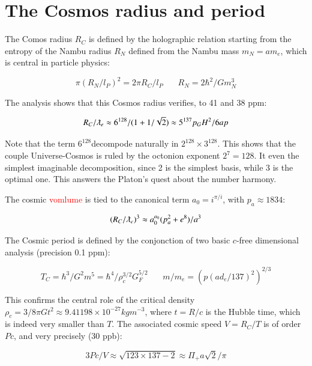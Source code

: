 \documentclass[a4paper,9pt]{article}
\begin{document}
\section{The Cosmos radius and period}

The Comos radius $R_C$ is defined by the holographic relation starting from the entropy of the Nambu radius $R_N$ defined from the Nambu mass $m_N = am_e$, which is central in particle physics:

\begin{equation}
\pi (R_N/l_P)^2 = 2\pi R_C/l_P ~~~~~~~~   R_N = 2\hbar^2/ Gm_N^3
\end{equation}

The analysis shows that this Cosmos radius verifies, to 41 and 38 ppm:

\begin{equation}
R_C/\lambdabar_e \approx 6^{128}/(1+1/\sqrt2) \approx 5^{137} p_GH^2/6ap
\end{equation}

Note that the term $6^{128}$decompode naturally in $2^{128} \times 3^{128}$. This shows that the couple Universe-Cosmos is ruled by the octonion exponent $2^7 = 128$. It even the simplest imaginable decomposition, since 2 is the simplest basis, while 3 is the optimal one. This answers the Platon's quest about the number harmony. 


The cosmic \textcolor{red}{vomlume} is tied to the canonical term $a_0 = i^{\pi/i}$, with $p_a\approx 1834$:

\begin{equation}
(R_C/\lambdabar_e)^3 \approx a_0^{a_0} (p_a^2 + e^8)/a^3
\end{equation}

The Cosmic period is defined by the conjonction of two basic $c$-free dimensional analysis (precision 0.1 ppm):

\begin{equation}
T_C = \hbar^3/G^2m^5 = \hbar^4/\rho_c^{3/2}G_F^{5/2} ~~~~~~~~   m/m_e = (p(ad_e/137)^2)^{2/3}
\end{equation}

This confirms the central role of the critical density $\rho_c = 3/8 \pi G t^2 \approx 9.41198 \times 10^{-27} kg m^{-3}$, where $t = R/c$ is the Hubble time, which is indeed very smaller than $T$. The associated cosmic speed $V = R_C/T$ is of order $Pc$, and very precisely (30 ppb):


\begin{equation}
3Pc/V \approx \sqrt{123 \times 137 - 2} \approx \Pi_+ a \sqrt {2} / \pi  
\end{equation}
\end{document}
